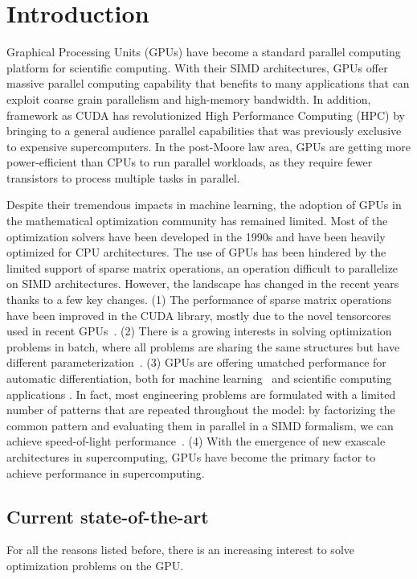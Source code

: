 \section{Introduction}
Graphical Processing Units (GPUs) have become a standard parallel computing platform
for scientific computing. With their SIMD architectures,
GPUs offer massive parallel computing capability that benefits to many
applications that can exploit coarse grain parallelism and high-memory bandwidth.
In addition, framework as CUDA has revolutionized High Performance Computing (HPC)
by bringing to a general audience parallel capabilities that was previously
exclusive to expensive supercomputers. In the post-Moore law area, GPUs
are getting more power-efficient than CPUs to run parallel workloads, as they require
fewer transistors to process multiple tasks in parallel.

Despite their tremendous impacts in machine learning, the
adoption of GPUs in the mathematical optimization community has
remained limited. Most of the optimization solvers have been developed
in the 1990s and have been heavily optimized for CPU architectures.
The use of GPUs has been hindered by the limited support of
sparse matrix operations, an operation difficult to parallelize
on SIMD architectures. However, the landscape has changed in the
recent years thanks to a few key changes.
(1) The performance of sparse matrix operations have been improved
in the CUDA library, mostly due to the novel tensorcores used
in recent GPUs~\cite{markidis2018nvidia}.
(2) There is a growing interests in solving optimization
problems in batch, where all problems are sharing the same
structures but have different parameterization~\cite{amos2017optnet,pineda2022theseus}.
(3) GPUs are offering umatched performance for automatic differentiation,
both for machine learning~\cite{jax2018github} and scientific computing applications \cite{enzyme2021}.
In fact, most engineering problems are formulated with a limited
number of patterns that are repeated throughout the model: by factorizing
the common pattern and evaluating them in parallel in a SIMD formalism,
we can achieve speed-of-light performance~\cite{shin2023accelerating}.
(4) With the emergence of new exascale architectures in supercomputing,
GPUs have become the primary factor to achieve performance in
supercomputing.

\subsection{Current state-of-the-art}
For all the reasons listed before, there is an increasing interest
to solve optimization problems on the GPU.

